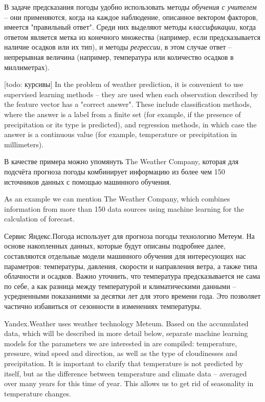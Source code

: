 \documentclass[14pt]{matmex-diploma}
\begin{document}
В задаче предсказания погоды удобно использовать методы \textit{обучения с учителем} -- они применяются, когда на каждое наблюдение, описанное вектором факторов, имеется "правильный ответ". Среди них выделяют методы \textit{классификации}, когда ответом является метка из конечного множества (например, если предсказывается наличие осадков или их тип), и методы \textit{регрессии}, в этом случае ответ -- непрерывная величина (например, температура или количество осадков в миллиметрах).

[todo: курсивы] In the problem of weather prediction, it is convenient to use supervised learning methods -- they are used when each observation described by the feature vector has a "correct answer". These include classification methods, where the answer is a label from a finite set (for example, if the presence of precipitation or its type is predicted), and regression methods, in which case the answer is a continuous value (for example, temperature or precipitation in millimeters).

В качестве примера можно упомянуть The Weather Company, которая для подсчёта прогноза погоды комбинирует информацию из более чем 150 источников данных с помощью машинного обучения\cite{ibm_weather}.

As an example we can mention The Weather Company, which combines information from more than 150 data sources using machine learning for the calculation of forecast\cite{ibm_weather}.

Сервис Яндекс.Погода использует для прогноза погоды технологию Метеум. На основе накопленных данных, которые будут описаны подробнее далее, составляются отдельные модели машинного обучения для интересующих нас параметров: температуры, давления, скорости и направления ветра, а также типа облачности и осадков. Важно уточнить, что температура предсказывается не сама по себе, а как разница между температурой и климатическими данными -- усредненными показаниями за десятки лет для этого времени года. Это позволяет частично избавиться от сезонности в изменениях температуры.

Yandex.Weather uses weather technology Meteum. Based on the accumulated data, which will be described in more detail below, separate machine learning models for the parameters we are interested in are compiled: temperature, pressure, wind speed and direction, as well as the type of cloudinesses and precipitation. It is important to clarify that temperature is not predicted by itself, but as the difference between temperature and climate data -- averaged over many years for this time of year. This allows us to get rid of seasonality in temperature changes.
\end{document}
